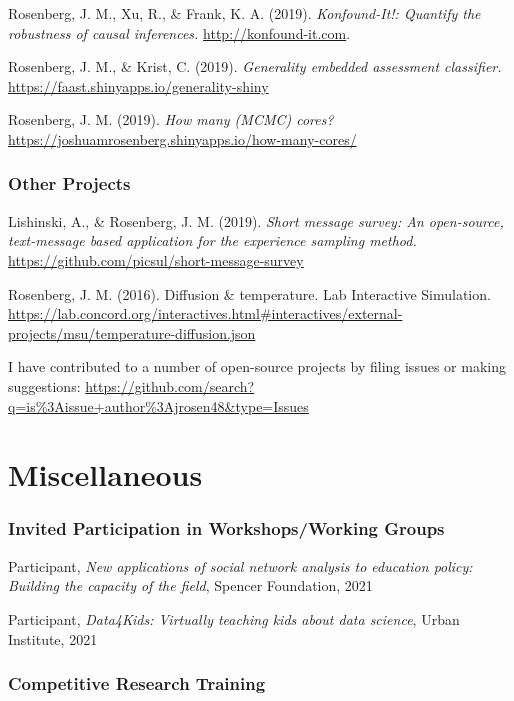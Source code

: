 \documentclass[
  14,
]{article}
\begin{document}
Rosenberg, J. M., Xu, R., \& Frank, K. A. (2019). \emph{Konfound-It!:
Quantify the robustness of causal inferences.}
\url{http://konfound-it.com}.

Rosenberg, J. M., \& Krist, C. (2019). \emph{Generality embedded
assessment classifier.}
\url{https://faast.shinyapps.io/generality-shiny}

Rosenberg, J. M. (2019). \emph{How many (MCMC) cores?}
\url{https://joshuamrosenberg.shinyapps.io/how-many-cores/}

\hypertarget{other-projects}{%
\subsubsection{Other Projects}\label{other-projects}}

Lishinski, A., \& Rosenberg, J. M. (2019). \emph{Short message survey:
An open-source, text-message based application for the experience
sampling method.} \url{https://github.com/picsul/short-message-survey}

Rosenberg, J. M. (2016). Diffusion \& temperature. Lab Interactive
Simulation.
\url{https://lab.concord.org/interactives.html\#interactives/external-projects/msu/temperature-diffusion.json}

I have contributed to a number of open-source projects by filing issues
or making suggestions:
\url{https://github.com/search?q=is\%3Aissue+author\%3Ajrosen48\&type=Issues}

\hypertarget{miscellaneous}{%
\section{Miscellaneous}\label{miscellaneous}}

\hypertarget{invited-participation-in-workshopsworking-groups}{%
\subsubsection{Invited Participation in Workshops/Working
Groups}\label{invited-participation-in-workshopsworking-groups}}

Participant, \emph{New applications of social network analysis to
education policy: Building the capacity of the field}, Spencer
Foundation, 2021

Participant, \emph{Data4Kids: Virtually teaching kids about data
science}, Urban Institute, 2021

\hypertarget{competitive-research-training}{%
\subsubsection{Competitive Research
Training}\label{competitive-research-training}}
\end{document}
